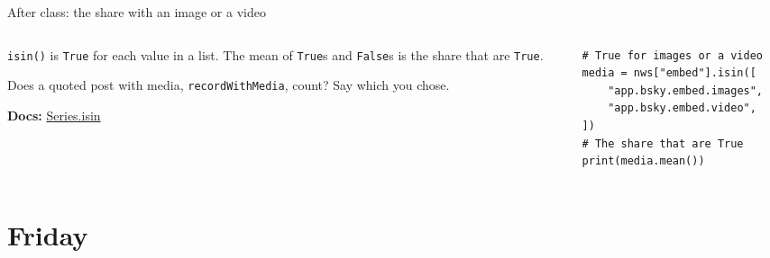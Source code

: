 \documentclass[9pt,aspectratio=169]{beamer}
\begin{document}
\begin{frame}[fragile]{After class: the share with an image or a video}
    \begin{columns}[T]
        \begin{column}{0.37\textwidth}
            \texttt{isin()} is \texttt{True} for each value in a list. The mean of \texttt{True}s and \texttt{False}s is the share that are \texttt{True}.

            \medskip
            Does a quoted post with media, \texttt{recordWithMedia}, count? Say which you chose.

            \medskip
            {\scriptsize\textbf{Docs:} \href{https://pandas.pydata.org/docs/reference/api/pandas.Series.isin.html}{Series.isin}\par}
        \end{column}
        \begin{column}{0.6\textwidth}
\begin{lstlisting}
# True for images or a video
media = nws["embed"].isin([
    "app.bsky.embed.images",
    "app.bsky.embed.video",
])
# The share that are True
print(media.mean())
\end{lstlisting}
        \end{column}
    \end{columns}
\end{frame}

\section{Friday}
\end{document}
